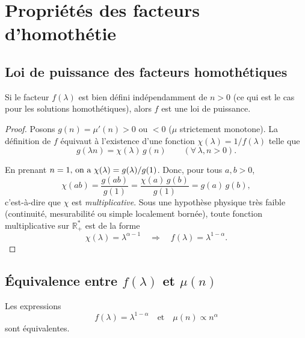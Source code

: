 \chapter{Propriétés des facteurs d'homothétie}\label{annex:homo}
\minitoc

\section{Loi de puissance des facteurs homothétiques}

\begin{Theo}
Si le facteur
\(
f(\lambda)
\)
est bien défini indépendamment de \(n>0\) (ce qui est le cas pour les solutions homothétiques),
alors \(f\) est une loi de puissance.
\end{Theo}

\begin{proof}
Posons \(g(n) = \mu'(n)>0\) ou \(<0\) (\ie $\mu$ strictement monotone). La définition de \(f\) équivaut à l’existence d’une fonction
\(\chi(\lambda)=1/f(\lambda)\) telle que
\[
g(\lambda n)=\chi(\lambda)\,g(n)\qquad(\forall\,\lambda,n>0).
\]

En prenant \(n=1$, on a \(\chi(\lambda)=g(\lambda)/g(1)\). Donc, pour tous \(a,b>0\),
\[
\chi(ab)=\frac{g(ab)}{g(1)}=\frac{\chi(a)\,g(b)}{g(1)}=g(a)\,g(b),
\]
c’est-à-dire que \(\chi\) est \emph{multiplicative}. Sous une hypothèse physique très faible
(continuité, mesurabilité ou simple localement bornée), toute fonction multiplicative sur
\(\mathbb{R}_+^\ast\) est de la forme
\[
\chi(\lambda)=\lambda^{\alpha-1}
\quad\Rightarrow\quad
f(\lambda)=\lambda^{1-\alpha}.
\]
\end{proof}

\section{Équivalence entre $f(\lambda)$ et $\mu(n)$}

\begin{Theo}
Les expressions
\[
f(\lambda) = \lambda^{1-\alpha} \quad \text{et} \quad \mu (n) \propto n^\alpha
\]
sont équivalentes.
\end{Theo}

